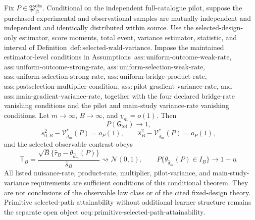 Fix \(P\in\mathfrak P_{\mathcal D}^{\mathrm{obs}}\). Conditional on the independent full-catalogue pilot, suppose the purchased experimental and observational samples are mutually independent and independent and identically distributed within source. Use the selected-design-only estimator, score moments, total event, variance estimator, statistic, and interval of Definition~\(\mathrm{def{:}selected\text{-}wald\text{-}variance}\). Impose the maintained estimator-level conditions in Assumptions~\(\mathrm{ass{:}uniform\text{-}outcome\text{-}weak\text{-}rate}\), \(\mathrm{ass{:}uniform\text{-}outcome\text{-}strong\text{-}rate}\), \(\mathrm{ass{:}uniform\text{-}selection\text{-}weak\text{-}rate}\), \(\mathrm{ass{:}uniform\text{-}selection\text{-}strong\text{-}rate}\), \(\mathrm{ass{:}uniform\text{-}bridge\text{-}product\text{-}rate}\), \(\mathrm{ass{:}postselection\text{-}multiplier\text{-}condition}\), \(\mathrm{ass{:}pilot\text{-}gradient\text{-}variance\text{-}rate}\), and \(\mathrm{ass{:}main\text{-}gradient\text{-}variance\text{-}rate}\), together with the four declared bridge-rate vanishing conditions and the pilot and main-study variance-rate vanishing conditions. Let \(m\to\infty\), \(B\to\infty\), and \(\underline v_m=o(1)\). Then
\[
 P(\mathsf G_{\mathrm{tot}})\longrightarrow1,
\]
\[
 s_{0,B}^2-\mathcal V_{\widehat d_m}^*(P)=o_P(1),
 \qquad
 \widehat s_B^2-\mathcal V_{\widehat d_m}^*(P)=o_P(1),
\]
and the selected observable contrast obeys
\[
 \mathsf T_B=
 \frac{\sqrt B\{\widehat\tau_B-\theta_{\widehat d_m}(P)\}}{\widehat s_B}
 \rightsquigarrow\mathcal N(0,1),
 \qquad
 P\{\theta_{\widehat d_m}(P)\in I_B\}\longrightarrow1-\eta.
\]
All listed nuisance-rate, product-rate, multiplier, pilot-variance, and main-study-variance requirements are sufficient conditions of this conditional theorem. They are not conclusions of the observable law class or of the cited fixed-design theory. Primitive selected-path attainability without additional learner structure remains the separate open object \(\mathrm{oeq{:}primitive\text{-}selected\text{-}path\text{-}attainability}\).